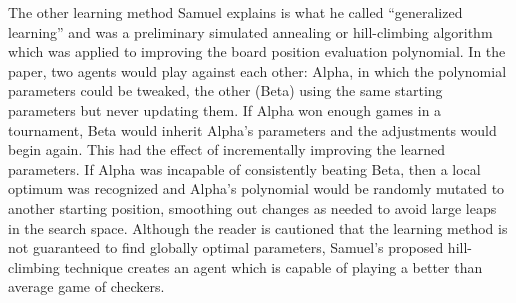 The other learning method Samuel explains is what he called
``generalized learning''
and was a preliminary simulated annealing or hill-climbing algorithm
which was applied to improving the board position evaluation polynomial.
%
In the paper,
two agents would play against each other:
Alpha, in which the polynomial parameters could be tweaked,
the other (Beta) using the same starting parameters but never updating them.
%
If Alpha won enough games in a tournament,
Beta would inherit Alpha's parameters and the adjustments would begin again.
%
This had the effect of incrementally improving the learned parameters.
%
If Alpha was incapable of consistently beating Beta,
then a local optimum was recognized and Alpha's polynomial would be randomly
mutated to another starting position,
smoothing out changes as needed to avoid large leaps in the search space.
%
Although the reader is cautioned that the learning method is not guaranteed to
find globally optimal parameters,
Samuel's proposed hill-climbing technique creates an agent which is capable
of playing a better than average game of checkers.

